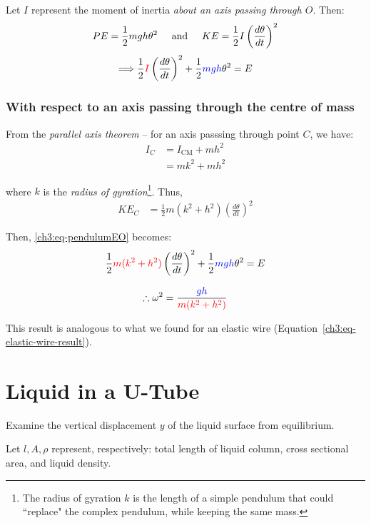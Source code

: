 \documentclass[11pt,letterpaper,titlepage,oneside]{book}
\newcommand{\htab}{\hspace{0.5cm}}
\newcommand{\andd}{\htab\text{and}\htab}
\newcommand{\kcol}[1]{\textcolor{blue}{#1}}
\newcommand{\mcol}[1]{\textcolor{red}{#1}}
\begin{document}
Let $I$ represent the moment of inertia \emph{about an axis passing through $O$}. Then:
\begin{equation*}
PE = \frac{1}{2} mgh\theta^2 \andd
KE = \frac{1}{2} I\left( \frac{d\theta}{dt} \right)^2
\end{equation*}
\begin{equation} 
	\Longrightarrow
	\frac{1}{2} \mcol{I}\left( \frac{d\theta}{dt} \right)^2 + \frac{1}{2} \kcol{mgh}\theta^2 = E \label{ch3:eq-pendulumEO}
\end{equation}

\subsubsection{With respect to an axis passing through the centre of mass}
From the \emph{parallel axis theorem} -- for an axis passsing through point $C$, we have:
\begin{align*}
	I_C &= I_\text{CM} + mh^2 \\
	&= mk^2 + mh^2
\end{align*}

where $k$ is the \emph{radius of gyration}\footnote{The radius of gyration $k$ is the length of a simple pendulum that could ``replace" the complex pendulum, while keeping the same mass.}. Thus,
\begin{align*}
	KE_C %
	&= \frac{1}{2} m(k^2 + h^2 ) \left( \frac{d\theta}{dt} \right)^2
\end{align*}

Then, \eqref{ch3:eq-pendulumEO} becomes:
\[ \frac{1}{2} \mcol{m(k^2+h^2)} \left( \frac{d\theta}{dt} \right)^2  + \frac{1}{2} \kcol{mgh}\theta^2 = E \]

\begin{equation*}
	\therefore \omega^2 = \frac{\kcol{gh}}{\mcol{m(k^2+h^2)}}
\end{equation*}

This result is analogous to what we found for an elastic wire (Equation~\ref{ch3:eq-elastic-wire-result}).

\section{Liquid in a U-Tube} \label{ch3:sec-uTube}
Examine the vertical displacement $y$ of the liquid surface from equilibrium.

Let $l, A, \rho$ represent, respectively: total length of liquid column, cross sectional area, and liquid density.
\end{document}

